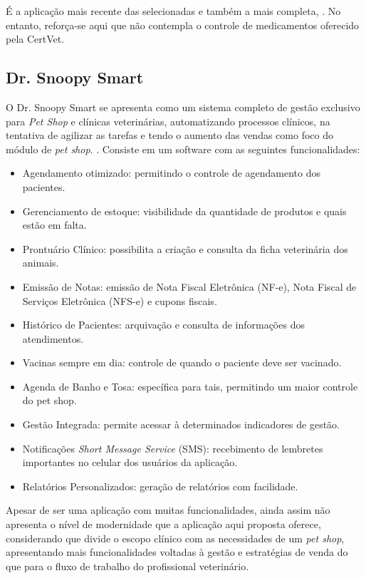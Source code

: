 \documentclass[
    12pt,               %
    openright,          %
    oneside,
    a4paper,            %
    BIBLATEX,           %
    TODO,               %
    english,            %
    brazil              %
    ]{ifsp-spo-inf-ctds}
\begin{document}
    É a aplicação mais recente das selecionadas e também a mais completa, . No entanto, reforça-se aqui que não contempla o controle de medicamentos oferecido pela CertVet.

        \subsection{Dr. Snoopy Smart}
        O Dr. Snoopy Smart se apresenta como um sistema completo de gestão exclusivo para \emph{Pet Shop} e clínicas veterinárias, automatizando processos clínicos, na tentativa de agilizar as tarefas e tendo o aumento das vendas como foco do módulo de \emph{pet shop}. . Consiste em um software com as seguintes funcionalidades:

\begin{itemize}
    \item Agendamento otimizado: permitindo o controle de agendamento dos pacientes.
    \item Gerenciamento de estoque: visibilidade da quantidade de produtos e quais estão em falta.
    \item Prontuário Clínico: possibilita a criação e consulta da ficha veterinária dos animais.
    \item Emissão de Notas: emissão de Nota Fiscal Eletrônica (NF-e), Nota Fiscal de Serviços Eletrônica (NFS-e) e cupons fiscais.
    \item Histórico de Pacientes: arquivação e consulta de informações dos atendimentos. 
    \item Vacinas sempre em dia: controle de quando o paciente deve ser vacinado.
    \item Agenda de Banho e Tosa: específica para tais, permitindo um maior controle do pet shop.
    \item Gestão Integrada: permite acessar à determinados indicadores de gestão.
    \item Notificações \emph{Short Message Service} (SMS): recebimento de lembretes importantes no celular dos usuários da aplicação.
    \item Relatórios Personalizados: geração de relatórios com facilidade.
\end{itemize}

    Apesar de ser uma aplicação com muitas funcionalidades, ainda assim não apresenta o nível de modernidade que a aplicação aqui proposta oferece, considerando que divide o escopo clínico com as necessidades de um \emph{pet shop}, apresentando mais funcionalidades voltadas à gestão e estratégias de venda do que para o fluxo de trabalho do profissional veterinário.
\end{document}
